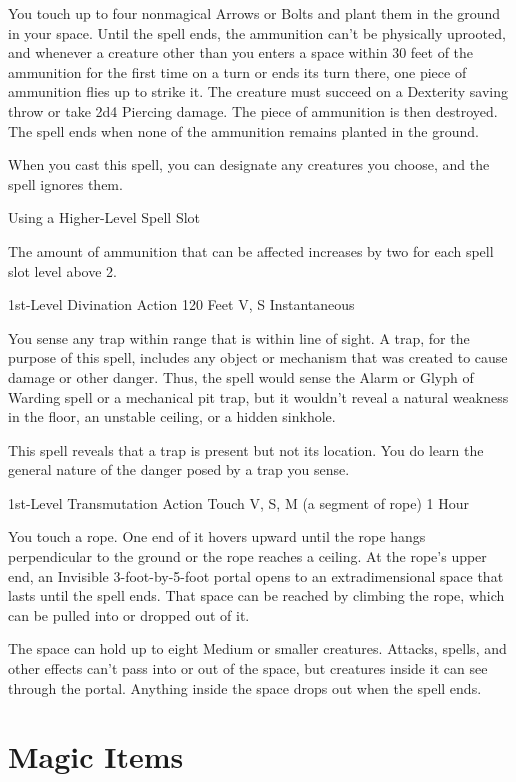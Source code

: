 \documentclass[letterpaper,openany,oneside,twocolumn]{book}
\begin{document}
You touch up to four nonmagical Arrows or Bolts and plant them in the ground in your space. Until the spell ends, the ammunition can't be physically uprooted, and whenever a creature other than you enters a space within 30 feet of the ammunition for the first time on a turn or ends its turn there, one piece of ammunition flies up to strike it. The creature must succeed on a Dexterity saving throw or take 2d4 Piercing damage. The piece of ammunition is then destroyed. The spell ends when none of the ammunition remains planted in the ground.

When you cast this spell, you can designate any creatures you choose, and the spell ignores them.

\subparagraph*{Using a Higher-Level Spell Slot} The amount of ammunition that can be affected increases by two for each spell slot level above 2.

	{1st-Level Divination}
	{Action}
	{120 Feet}
	{V, S}
	{Instantaneous}

You sense any trap within range that is within line of sight. A trap, for the purpose of this spell, includes any object or mechanism that was created to cause damage or other danger. Thus, the spell would sense the Alarm or Glyph of Warding spell or a mechanical pit trap, but it wouldn't reveal a natural weakness in the floor, an unstable ceiling, or a hidden sinkhole.

This spell reveals that a trap is present but not its location. You do learn the general nature of the danger posed by a trap you sense.

	{1st-Level Transmutation}
	{Action}
	{Touch}
	{V, S, M (a segment of rope)}
	{1 Hour}

You touch a rope. One end of it hovers upward until the rope hangs perpendicular to the ground or the rope reaches a ceiling. At the rope's upper end, an Invisible 3-foot-by-5-foot portal opens to an extradimensional space that lasts until the spell ends. That space can be reached by climbing the rope, which can be pulled into or dropped out of it.

The space can hold up to eight Medium or smaller creatures. Attacks, spells, and other effects can't pass into or out of the space, but creatures inside it can see through the portal. Anything inside the space drops out when the spell ends.

\part*{Magic Items}
\end{document}
